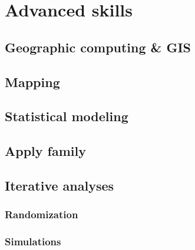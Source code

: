 \documentclass[
]{book}
\begin{document}
\hypertarget{advanced-skills}{%
\chapter{Advanced skills}\label{advanced-skills}}

\hypertarget{geographic-computing-gis}{%
\section{Geographic computing \& GIS}\label{geographic-computing-gis}}

\hypertarget{mapping}{%
\section{Mapping}\label{mapping}}

\hypertarget{statistical-modeling}{%
\section{Statistical modeling}\label{statistical-modeling}}

\hypertarget{apply-family}{%
\section{Apply family}\label{apply-family}}

\hypertarget{iterative-analyses}{%
\section{Iterative analyses}\label{iterative-analyses}}

\hypertarget{randomization}{%
\subsection{Randomization}\label{randomization}}

\hypertarget{simulations}{%
\subsection{Simulations}\label{simulations}}

  
\end{document}
